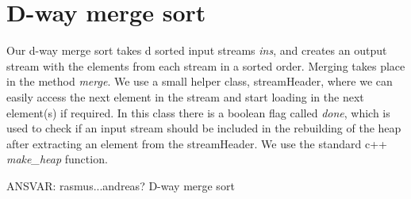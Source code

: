 \section{D-way merge sort}

Our d-way merge sort takes d sorted input streams \textit{ins}, and creates an output stream with the elements from each stream in a sorted order. Merging takes place in the method \textit{merge}. We use a small helper class, streamHeader, where we can easily access the next element in the stream and start loading in the next element(s) if required. In this class there is a boolean flag called \textit{done}, which is used to check if an input stream should be included in the rebuilding of the heap after extracting an element from the streamHeader.
We use the standard c++ \textit{make_heap} function.

ANSVAR: rasmus...andreas?
D-way merge sort


